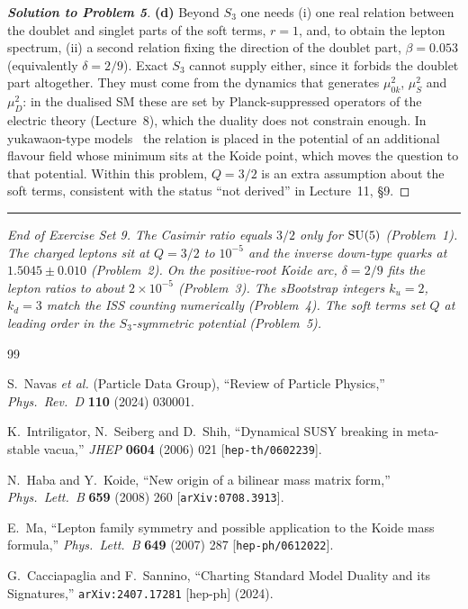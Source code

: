 \documentclass[11pt,a4paper]{article}
\begin{document}
\begin{proof}[\textbf{Solution to Problem 5}]
\medskip

\textbf{(d)} Beyond $S_3$ one needs (i) one real relation between the
doublet and singlet parts of the soft terms, $r = 1$, and, to obtain
the lepton spectrum, (ii) a second relation fixing the direction of
the doublet part, $\beta = 0.053$ (equivalently $\delta = 2/9$).  Exact $S_3$ cannot supply either, since it
forbids the doublet part altogether.  They must come from the dynamics
that generates $\mu_{0k}^2$, $\mu_S^2$ and $\mu_D^2$: in the dualised
SM these are set by Planck-suppressed operators of the electric theory
(Lecture~8), which the duality does not constrain enough.  In
yukawaon-type models~\cite{HabaKoide2008,Ma2007} the relation is
placed in the potential of an additional flavour field whose minimum
sits at the Koide point, which moves the question to that potential.
Within this problem, $Q = 3/2$ is an extra assumption about the soft
terms, consistent with the status ``not derived'' in Lecture~11, \S9.

\end{proof}


\bigskip

\begin{center}
\rule{0.6\textwidth}{0.4pt}

\textit{End of Exercise Set 9.  The Casimir ratio equals $3/2$ only
for $\mathrm{SU}(5)$ (Problem~1). The charged leptons sit at $Q = 3/2$ to
$10^{-5}$ and the inverse down-type quarks at $1.5045 \pm 0.010$
(Problem~2). On the positive-root Koide arc, $\delta = 2/9$ fits the
lepton ratios to about $2\times10^{-5}$ (Problem~3). The sBootstrap
integers $k_u=2$, $k_d=3$ match the ISS counting numerically
(Problem~4). The soft terms set $Q$ at leading order in the
$S_3$-symmetric potential (Problem~5).}
\end{center}


\begin{thebibliography}{99}

  S.~Navas \textit{et al.} (Particle Data Group),
  ``Review of Particle Physics,''
  \textit{Phys.\ Rev.\ D} \textbf{110} (2024) 030001.

  K.~Intriligator, N.~Seiberg and D.~Shih,
  ``Dynamical SUSY breaking in meta-stable vacua,''
  \textit{JHEP} \textbf{0604} (2006) 021
  [\texttt{hep-th/0602239}].

  N.~Haba and Y.~Koide,
  ``New origin of a bilinear mass matrix form,''
  \textit{Phys.\ Lett.\ B} \textbf{659} (2008) 260
  [\texttt{arXiv:0708.3913}].

  E.~Ma,
  ``Lepton family symmetry and possible application to the Koide mass
  formula,''
  \textit{Phys.\ Lett.\ B} \textbf{649} (2007) 287
  [\texttt{hep-ph/0612022}].

  G.~Cacciapaglia and F.~Sannino,
  ``Charting Standard Model Duality and its Signatures,''
  \texttt{arXiv:2407.17281} [hep-ph] (2024).

\end{thebibliography}
\end{document}
